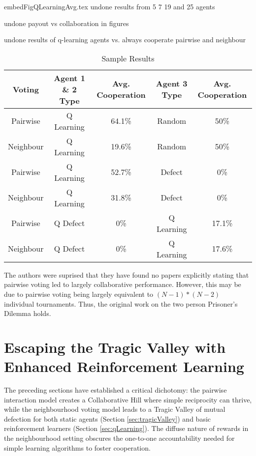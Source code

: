 \documentclass[]{llncs} %
\begin{document}
 {embedFigQLearningAvg.tex}
undone results from 5 7 19 and 25 agents

undone payout vs collaboration in figures

undone results of q-learning agents vs. always cooperate pairwise and
neighbour

\begin{table}
  \caption{Sample Results}
  \label{tableResults}
  
\begin {tabular}  {|c|c c|c c|}
\hline
Voting & Agent 1 \& 2 Type & Avg. Cooperation & Agent 3 Type  & Avg. Cooperation \\
\hline
Pairwise &Q Learning& 64.1\%& Random &50\%\\
\hline
Neighbour &Q Learning& 19.6\%& Random &50\%\\
\hline

Pairwise &Q Learning& 52.7\%& Defect&0\%\\
\hline
Neighbour &Q Learning& 31.8\%& Defect&0\%\\
\hline

Pairwise &Q Defect& 0\%& Q Learning &17.1\%\\
\hline
Neighbour &Q Defect& 0\%& Q Learning &17.6\%\\
\hline
\end {tabular}
\end{table}


The authors were suprised that they have found no papers explicitly stating
that pairwise voting led to largely collaborative performance.  However, this
may be due to pairwise voting being largely equivalent to
$(N-1)*(N-2)$ individual tournaments.  Thus, the original work on the
two person Prisoner's Dilemma holds.


\section{Escaping the Tragic Valley with Enhanced Reinforcement Learning}
\label{sec:enhanced_rl}

The preceding sections have established a critical dichotomy: the
pairwise interaction model creates a Collaborative Hill where simple
reciprocity can thrive, while the neighbourhood voting model leads to
a Tragic Valley of mutual defection for both static agents (Section
\ref{sec:tragicValley}) and basic reinforcement learners (Section
\ref{sec:qLearning}). The diffuse nature of rewards in the
neighbourhood setting obscures the one-to-one accountability needed
for simple learning algorithms to foster cooperation.
\end{document}
